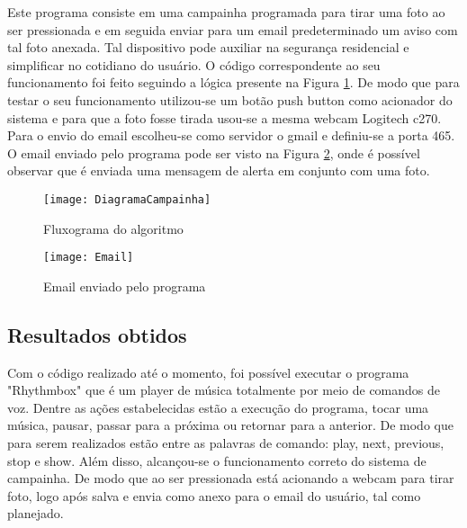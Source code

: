 Este programa consiste em uma campainha programada para tirar uma foto ao ser pressionada e em seguida enviar para um email predeterminado um aviso com tal foto anexada. Tal dispositivo pode auxiliar na segurança residencial e simplificar no cotidiano do usuário. O código correspondente ao seu funcionamento foi feito seguindo a lógica presente na Figura \ref{fig-DiagramaCampainha}. De modo que para testar o seu funcionamento utilizou-se um botão push button como acionador do sistema e para que a foto fosse tirada usou-se a mesma webcam Logitech c270. Para o envio do email escolheu-se como servidor o gmail e definiu-se a porta 465. O email enviado pelo programa pode ser visto na Figura \ref{fig-Email}, onde é possível observar que é enviada uma mensagem de alerta em conjunto com uma foto.
\begin{figure}[htbp]
	\centering
		\texttt{[image: DiagramaCampainha]}
	\caption{Fluxograma do algoritmo}
	\label{fig-DiagramaCampainha}
\end{figure}


\begin{figure}[htbp]
	\centering
		\texttt{[image: Email]}
	\caption{Email enviado pelo programa}
	\label{fig-Email}
\end{figure}

\subsection{Resultados obtidos}

Com o código realizado até o momento, foi possível executar o programa "Rhythmbox" que é um player de música totalmente por meio de comandos de voz. 
Dentre as ações estabelecidas estão a execução do programa, tocar uma música, pausar, passar para a próxima ou retornar para a anterior.
De modo que para serem realizados estão entre as palavras de comando: play, next, previous, stop e show.
Além disso, alcançou-se o funcionamento correto do sistema de campainha. De modo que ao ser pressionada está acionando a webcam para tirar foto, logo após salva e envia como anexo para o email do usuário, tal como planejado.


